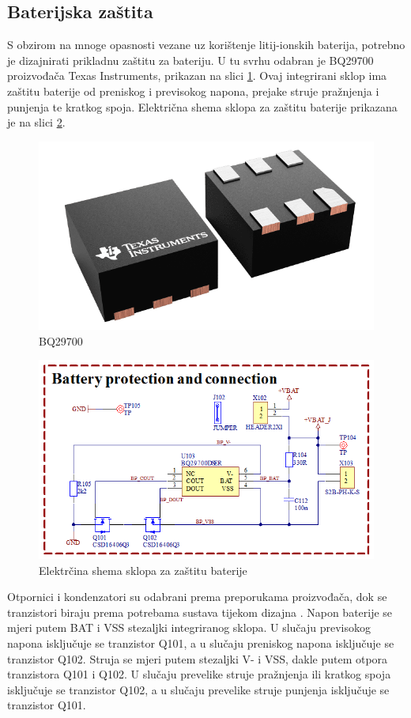 \subsection{Baterijska zaštita}
S obzirom na mnoge opasnosti vezane uz korištenje litij-ionskih baterija, potrebno je dizajnirati prikladnu zaštitu za bateriju. U tu svrhu odabran je BQ29700 proizvođača Texas Instruments, prikazan na slici \ref{slk:BQ29700}. Ovaj integrirani sklop ima zaštitu baterije od preniskog i previsokog napona, prejake struje pražnjenja i punjenja te kratkog spoja. Električna shema sklopa za zaštitu baterije prikazana je na slici \ref{slk:MB_BATPROT}.
\begin{figure}[hbt]
    \centering
    \includegraphics[width=6 cm]{Figures/BQ29700.png}
    \caption{BQ29700}
    \label{slk:BQ29700}
\end{figure}
\begin{figure}[!hbt]
    \centering
    \includegraphics[width=10 cm]{Figures/MB_BATPROT.png}
    \caption{Elektrčina shema sklopa za zaštitu baterije}
    \label{slk:MB_BATPROT}
\end{figure}
Otpornici i kondenzatori su odabrani prema preporukama proizvođača, dok se tranzistori biraju prema potrebama sustava tijekom dizajna \cite{ti:bq29700}. Napon baterije se mjeri putem BAT i VSS stezaljki integriranog sklopa. U slučaju previsokog napona isključuje se tranzistor Q101, a u slučaju preniskog napona isključuje se tranzistor Q102. Struja se mjeri putem stezaljki V- i VSS, dakle putem otpora tranzistora Q101 i Q102. U slučaju prevelike struje pražnjenja ili kratkog spoja isključuje se tranzistor Q102, a u slučaju prevelike struje punjenja isključuje se tranzistor Q101.

